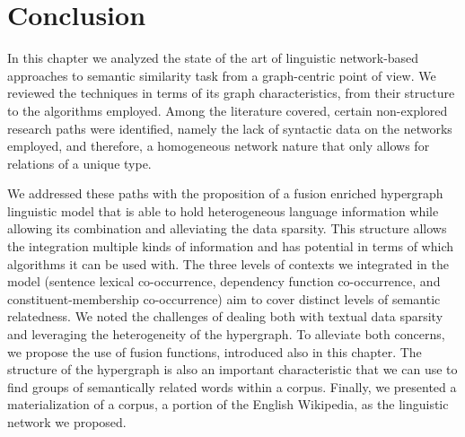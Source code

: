 \section{Conclusion}

In this chapter  we analyzed the state of the art of linguistic network-based approaches to semantic similarity task from a graph-centric point of view. We reviewed the techniques in terms of its graph characteristics, from their structure to the algorithms employed. Among the literature covered, certain non-explored research paths were identified, namely the lack of syntactic data on the networks employed, and therefore, a homogeneous network nature that only allows for relations of a unique type. 

We addressed these paths with the proposition of a fusion enriched hypergraph linguistic model that is able to hold heterogeneous language information while allowing its combination and alleviating the data sparsity.  This structure allows the integration multiple kinds of information and has potential in terms of which algorithms it can be used with. The three levels of contexts we integrated in the model (sentence lexical co-occurrence, dependency function co-occurrence, and constituent-membership co-occurrence) aim to cover distinct levels of semantic relatedness. We noted the challenges of dealing both with textual data sparsity and leveraging the heterogeneity of the hypergraph. To alleviate both concerns, we propose the use of fusion functions, introduced also in this chapter. The structure of the hypergraph is also an important characteristic that we can use to find groups of semantically related words within a corpus. Finally, we presented a materialization of a corpus, a portion of the English Wikipedia, as the linguistic network we proposed.



